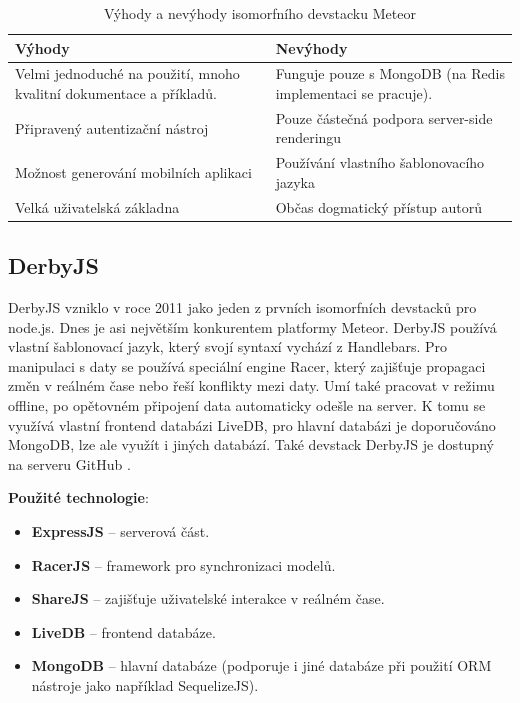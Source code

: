 \begin{table}[h]
\centering
	\caption{Výhody a nevýhody isomorfního devstacku Meteor \cite{isomorphic_pimentel}}
	\begin{tabular}{ |C{5cm}|C{5cm}| }
	\hline
	Výhody & Nevýhody \\ \hline
	Velmi jednoduché na použití, mnoho kvalitní dokumentace a příkladů. & Funguje pouze s MongoDB (na Redis implementaci se pracuje). \\ \hline
   Připravený autentizační nástroj & Pouze částečná podpora server-side renderingu \\ \hline
   Možnost generování mobilních aplikaci & Používání vlastního šablonovacího jazyka \\ \hline
   Velká uživatelská základna & Občas dogmatický přístup autorů \\ \hline
    \end{tabular}
	\label{tab:proscons_meteor}
\end{table}

\subsection{DerbyJS}
DerbyJS vzniklo v roce 2011 jako jeden z prvních isomorfních devstacků pro node.js. Dnes je asi největším konkurentem platformy Meteor. DerbyJS používá vlastní šablonovací jazyk, který svojí syntaxí vychází z Handlebars. Pro manipulaci s daty se používá speciální engine Racer, který zajišťuje propagaci změn v reálném čase nebo řeší konflikty mezi daty. Umí také pracovat v režimu offline, po opětovném připojení data automaticky odešle na server. K tomu se využívá vlastní frontend databázi LiveDB, pro hlavní databázi je doporučováno MongoDB, lze ale využít i jiných databází. Také devstack DerbyJS je dostupný na serveru GitHub \cite{isomorphic_pimentel}  \cite{derbyjs}.

\pagebreak
\vspace{3mm}
\noindent\textbf{Použité technologie}:
\begin{itemize}
\item \textbf{ExpressJS} – serverová část.
\item \textbf{RacerJS} – framework pro synchronizaci modelů.
\item \textbf{ShareJS} – zajišťuje uživatelské interakce v reálném čase.
\item \textbf{LiveDB} – frontend databáze.
\item \textbf{MongoDB} – hlavní databáze (podporuje i jiné databáze při použití ORM nástroje jako například SequelizeJS).
\end{itemize}

